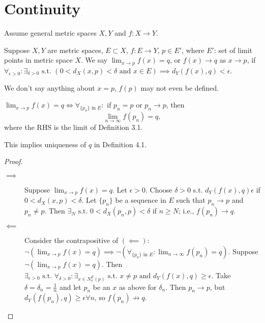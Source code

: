 \chapter{Continuity}
Assume general metric spaces $X,Y$ and $f: X\to Y$.
\begin{definition}[4.1]
	\label{def:4.1}
	Suppose $X,Y$ are metric spaces, $E \subset X$, $f: E\to Y$, $p \in E'$, where $E'$: set of limit points in metric space $X$.
	We say $\lim_{x\to p}{f(x)}=q$, or $f(x)\to q$ as $x\to p$, if $\forall_{\epsilon > 0}: \exists_{\delta>0} \text{ s.t. } (0<d_X(x,p)<\delta \text{ and } x \in E) \implies d_Y(f(x),q)<\epsilon $.
	\begin{note}
		We don't say anything about $x=p$, $f(p)$ may not even be defined.
	\end{note}
\end{definition}


\begin{theorem}[2]
	$\lim_{x\to p}{f(x)}=q \Leftrightarrow \forall_{\{ {p}_{n}\} \text{ in } E}:
		\text{ if }  p_{n}=p \text{ or }  p_{n}\to p$, then
	\[
		\lim_{n\to \infty}{f(p_{n})}=q
		,\]
	where the RHS is the limit of Definition 3.1.
	\begin{note}
		This implies uniqueness of $q$ in Definition 4.1.
	\end{note}
	\begin{proof}
		\begin{description}
			\item[$\implies $]
			      Suppose $\lim_{x\to p}{f(x)}=q$. Let $\epsilon>0$. Choose $\delta>0$ s.t. $d_Y(f(x),q)\epsilon$ if $0<d_X(x,p)<\delta$.
			      Let $\{ p_{n} \}$ be a sequence in $E$ such that $p_{n}\to p$ and $p_{n}\neq p$. Then $\exists_{N} \text{ s.t. } 0<d_X(p_{n},p)<\delta $ if $n\ge N$; i.e., $f(p_n)\to q$.
			\item[$\impliedby$]
			      Consider the contrapositive of $(\impliedby) $: $\neg(\lim_{x\to p}{f(x)}=q) \implies \neg(\forall_{\{ p_{n} \} \text{ in } E}: \lim_{n\to \infty}{f(p_{n})}=q)$.
			      Suppose $\neg(\lim_{x\to p}{f(x)}=q)$. Then $\exists_{\epsilon>0} \text{ s.t. } \forall_{\delta>0}: \exists_{x\in N_{\delta}^{E}(p)} \text{ s.t. } x\neq p \text{ and } d_Y(f(x),q)\ge \epsilon$.
			      Take $\delta=\delta_n=\frac{1}{n}$ and let $p_{n}$ be an $x$ as above for $\delta_n$. Then $p_{n}\to p$, but $d_Y(f(p_{n}),q)\ge \epsilon \forall n$, so $f(p_{n})\not \to q$.
		\end{description}
	\end{proof}
\end{theorem}


